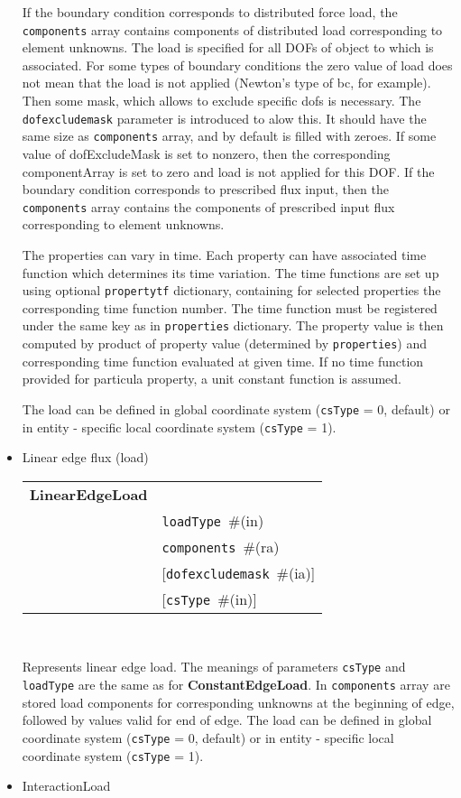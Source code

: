 \documentclass[a4paper]{report}
\newcommand{\param}[1]{\texttt{#1}} %
\newcommand{\optional}[1]{[#1]} %
\newcommand{\field}[2]{\param{#1}~\#{\tiny(#2)}} %
\newcommand{\optField}[2]{\optional{\field{#1}{#2}}}
\newcommand{\entKeywordInst}[1]{\textbf{#1}} %
\newenvironment{record}[1][]{\begin{tabular}{|ll}}{\end{tabular}\\}
\newcommand{\recentry}[2]{{#1}&{#2}\\}
\newcounter{rcc}
\newenvironment{record}[1][\textwidth]{\setcounter{rcc}{0}\rowcolors{1}{lightgray}{lightgray}\tabularx{#1}{llR} \hline}
               {\endtabularx}
\newcommand{\recentry}[2]{\ifthenelse{\value{rcc}>0}{$\backslash$ \\}{\setcounter{rcc}{1}}{#1}&{#2}&}
\begin{document}
\begin{itemize}
If the boundary condition corresponds to distributed force load, the \param{components} array contains components of distributed load corresponding to element unknowns.
The load is specified for all DOFs of object to which is associated.
For some types of boundary conditions the zero value of load does not mean that the load is not applied (Newton's type of bc, for example).
Then some mask, which allows to exclude specific dofs is necessary.
The \param{dofexcludemask} parameter is introduced to alow this.
It should have the same size as \param{components} array, and by
default is filled with zeroes. If some value of dofExcludeMask is set
to nonzero, then the corresponding componentArray
is set to zero and load is not applied for this DOF.
If the boundary condition corresponds to prescribed flux input, then
the \param{components} array contains the components of prescribed
input flux corresponding to element unknowns.

The properties can vary in time. Each property can have associated time function which determines its time variation. The time functions are set up using optional \param{propertytf} dictionary, containing for selected properties the corresponding time function number. The time function must be registered under the same key as in \param{properties} dictionary. The property value is then computed by product of property value (determined by \param{properties}) and corresponding time function evaluated at given time. If no time function provided for particula property, a unit constant function is assumed.

The load can be defined in global coordinate system (\param{csType} =
0, default) or in entity - specific local coordinate system
(\param{csType} = 1).
\item Linear edge flux (load)

\begin{record}[0.9\textwidth]
  \recentry{\entKeywordInst{LinearEdgeLoad}}{}
  \recentry{}{\field{loadType}{in}}
  \recentry{}{\field{components}{ra}}
  \recentry{}{\optField{dofexcludemask}{ia}}
  \recentry{}{\optField{csType}{in}}
\end{record}

Represents linear edge load. The meanings of parameters \param{csType} and \param{loadType} are the same as for
\entKeywordInst{ConstantEdgeLoad}.
In \param{components} array are stored load components for corresponding unknowns at the
beginning of edge, followed by values valid for end of edge.
The load can be defined in global coordinate system (\param{csType} = 0, default) or in entity - specific local coordinate system
(\param{csType} = 1).
\item InteractionLoad


\end{itemize}
\end{document}
